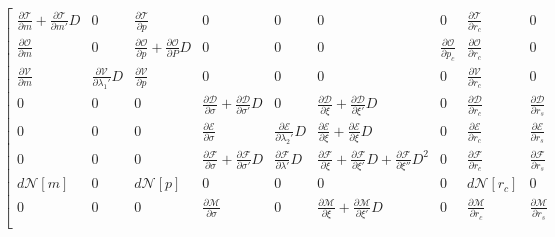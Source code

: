 \begin{equation}
\left[
\begin{array}{ccccccccc}
	\frac{\partial \mathcal{T}}{\partial m} + \frac{\partial \mathcal{T}}{\partial m'}D & 0 & \frac{\partial \mathcal{T}}{\partial p}
	& 0 & 0 & 0 & 0 & \frac{\partial \mathcal{T}}{\partial r_c} & 0 \\
	
	\frac{\partial \mathcal{O}}{\partial m} & 0 & \frac{\partial \mathcal{O}}{\partial p} + \frac{\partial \mathcal{O}}{\partial P}D
	& 0 & 0 & 0 & \frac{\partial \mathcal{O}}{\partial p_c} & \frac{\partial \mathcal{O}}{\partial r_c} & 0 \\
	
	\frac{\partial \mathcal{V}}{\partial m} & \frac{\partial \mathcal{V}}{\partial \lambda_1'}D & \frac{\partial \mathcal{V}}{\partial p} & 0 & 0 & 0 & 0 & \frac{\partial \mathcal{V}}{\partial r_c} & 0 \\
	
	0 & 0 & 0 & \frac{\partial \mathcal{D}}{\partial \sigma} + \frac{\partial \mathcal{D}}{\partial \sigma'}D &  0 & 
	\frac{\partial \mathcal{D}}{\partial \xi} + \frac{\partial \mathcal{D}}{\partial \xi'}D & 0 & \frac{\partial \mathcal{D}}{\partial r_c} & \frac{\partial \mathcal{D}}{\partial r_s} \\
	
	0 & 0 & 0 & \frac{\partial \mathcal{E}}{\partial \sigma} & \frac{\partial \mathcal{E}}{\partial \lambda_2'}D & \frac{\partial \mathcal{E}}{\partial \xi} + \frac{\partial \mathcal{E}}{\partial \xi}D & 0 & \frac{\partial \mathcal{E}}{\partial r_c} & \frac{\partial \mathcal{E}}{\partial r_s} \\
	
	0 & 0 & 0 & \frac{\partial \mathcal{F}}{\partial \sigma} + \frac{\partial \mathcal{F}}{\partial \sigma'}D & \frac{\partial \mathcal{F}}{\partial \lambda'}D & \frac{\partial \mathcal{F}}{\partial \xi} + \frac{\partial \mathcal{F}}{\partial \xi'}D + \frac{\partial \mathcal{F}}{\partial \xi''}D^2 & 0 & \frac{\partial \mathcal{F}}{\partial r_c} & \frac{\partial \mathcal{F}}{\partial r_s} \\
	
	d\mathcal{N}[m] & 0 & d\mathcal{N}[p] & 0 & 0 & 0 & 0 & d\mathcal{N}[r_c] & 0 \\
	
	0 & 0 & 0 & \frac{\partial \mathcal{M}}{\partial \sigma} & 0 & \frac{\partial \mathcal{M}}{\partial \xi} + \frac{\partial \mathcal{M}}{\partial \xi'}D & 0 & \frac{\partial \mathcal{M}}{\partial r_c} & \frac{\partial \mathcal{M}}{\partial r_s} \\
	

\end{array}
\end{equation}
